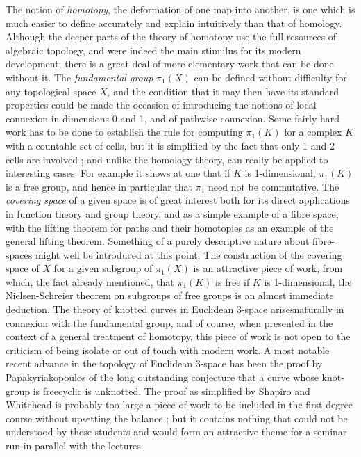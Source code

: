 The notion of \textit{homotopy}, the deformation of one map into
another, is one which is much easier to define accurately and explain
intuitively than that of homology. Although the deeper parts of the
theory of homotopy use the full resources of algebraic topology, and
were indeed the main stimulus for its modern development, there is a
great deal of more elementary work that can be done without it. The
\textit{fundamental group} $\pi_1(X)$ can be defined without
difficulty for any topological space $X$, and the condition that it
may then have its standard properties could be made the occasion of
introducing the notions of local connexion in dimensions 0 and 1, and
of pathwise connexion. Some fairly hard work has to be done to
establish the rule for computing $\pi_1(K)$  for a complex $K$ with a
countable set of cells, but it is simplified by the fact that only 1
and 2 cells are involved ; and unlike the homology theory, can really
be applied to interesting cases. For example it shows at one that if
$K$ is 1-dimensional, $\pi_1(K)$ is a free group, and hence in
particular that $\pi_1$ need not be commutative. The \textit{covering
  space} of a given space is of great interest both for its direct
applications in function theory and group theory, and as a simple
example of a fibre space, with the lifting theorem for paths and their
homotopies as an example of the general lifting theorem. Something of
a purely descriptive nature about fibre-spaces might well be
introduced at this point. The construction of the covering space of
$X$ for a given subgroup of $\pi_1 (X)$ is an attractive piece of
work, from which, the fact already mentioned, that $\pi_1 (K)$ is free
if $K$ is 1-dimensional, the Nielsen-Schreier theorem on subgroups of
free groups is an almost immediate deduction. The theory of knotted
curves in Euclidean 3-space arises\pageoriginale naturally in
connexion with the fundamental group, and of course, when presented
in the context of a general treatment of homotopy, this piece of work
is not open to the criticism of being isolate or out of touch with
modern work. A most notable recent advance in the topology of
Euclidean 3-space has been the proof by Papakyriakopoulos of the long
outstanding conjecture that a curve whose knot-group is freecyclic is
unknotted. The proof as simplified by Shapiro and Whitehead is
probably too large a piece of work to be included in the first degree
course without upsetting the balance ; but it contains nothing that
could not be understood by these students and would form an attractive
theme for a seminar run in parallel with the lectures.


